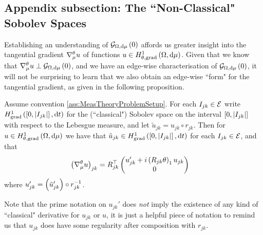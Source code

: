 \subsection{Appendix subsection: The ``Non-Classical" Sobolev Spaces} \label{ssec:SobSpacesTheory}
Establishing an understanding of $\mathcal{G}_{ \Omega, \mathrm{d}\mu}\left( 0 \right)$  affords us greater insight into the tangential gradient $\nabla^{\theta}_\mu u$ of functions $u\in H^1_{\theta, \mathrm{grad}}\left( \Omega, \mathrm{d}\mu \right)$.
Given that we know that $\nabla^{\theta}_\mu u \perp \mathcal{G}_{ \Omega, \mathrm{d}\mu}\left( 0 \right)$, and we have an edge-wise characterisation of $\mathcal{G}_{ \Omega, \mathrm{d}\mu}\left( 0 \right)$, it will not be surprising to learn that we also obtain an edge-wise ``form" for the tangential gradient, as given in the following proposition.
\begin{prop} \label{prop:GraphTangGrad}
	Assume convention \ref{ass:MeasTheoryProblemSetup}.
	For each $I_{jk}\in \mathcal{E}$ write $H^1_\mathrm{grad}\left( \left[ 0,\left\lvert I_{jk} \right\rvert \right], \mathrm{d}t \right)$ for the (``classical") Sobolev space on the interval $\left[ 0,\left\lvert I_{jk} \right\rvert \right]$ with respect to the Lebesgue measure, and let $\tilde{u}_{jk} = u_{jk} \circ r_{jk}$.
	Then for $u\in H^1_{\theta, \mathrm{grad}}\left( \Omega, \mathrm{d}\mu \right)$ we have that $\tilde{u}_{jk}\in H^1_\mathrm{grad}\left( \left[ 0,\left\lvert I_{jk} \right\rvert \right], \mathrm{d}t \right)$ for each $I_{jk}\in \mathcal{E}$, and that
	\begin{align*}
		\left(  \nabla^{\theta}_\mu u  \right)_{jk} 
		&= R_{jk}^\top \begin{pmatrix} u_{jk}' + i\left( R_{jk}\theta \right)_1 u_{jk} \\ 0	\end{pmatrix}
	\end{align*}
	where $u_{jk}' = \left(  \tilde{u}_{jk}'  \right) \circ r_{jk}^{-1}$.
\end{prop}
Note that the prime notation on $u_{jk}'$ does \emph{not} imply the existence of any kind of ``classical" derivative for $u_{jk}$ or $u$, it is just a helpful piece of notation to remind us that $u_{jk}$ does have some regularity after composition with $r_{jk}$.
